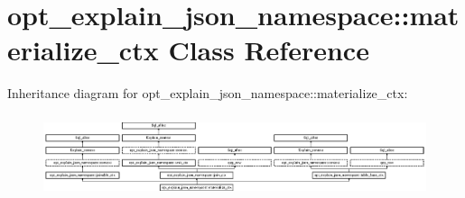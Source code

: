 \hypertarget{classopt__explain__json__namespace_1_1materialize__ctx}{}\section{opt\+\_\+explain\+\_\+json\+\_\+namespace\+:\+:materialize\+\_\+ctx Class Reference}
\label{classopt__explain__json__namespace_1_1materialize__ctx}
Inheritance diagram for opt\+\_\+explain\+\_\+json\+\_\+namespace\+:\+:materialize\+\_\+ctx\+:\begin{figure}[H]
\begin{center}
\leavevmode
\includegraphics[height=2.443636cm]{classopt__explain__json__namespace_1_1materialize__ctx}
\end{center}
\end{figure}
